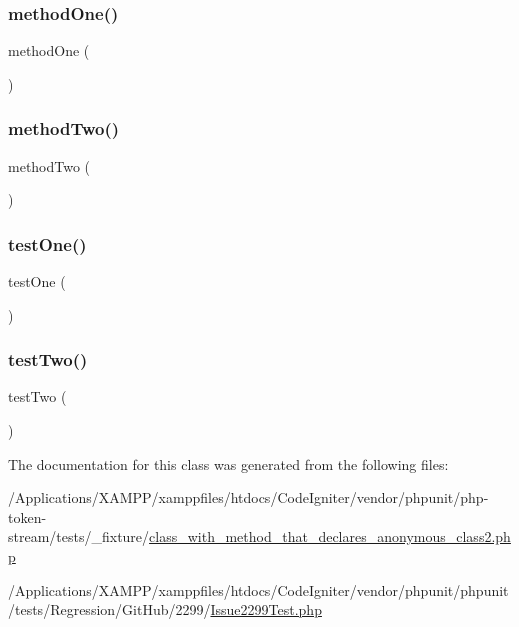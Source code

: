 \subsubsection{\texorpdfstring{method\+One()}{methodOne()}}
{\footnotesize\ttfamily method\+One (\begin{DoxyParamCaption}{ }\end{DoxyParamCaption})}

\mbox{\label{class_test_adc4891c4d8a68fb4b8c93e6b6bfe88a5}} 
\subsubsection{\texorpdfstring{method\+Two()}{methodTwo()}}
{\footnotesize\ttfamily method\+Two (\begin{DoxyParamCaption}{ }\end{DoxyParamCaption})}

\mbox{\label{class_test_afbf3ff88b322c6a7197ce02297cd23a0}} 
\subsubsection{\texorpdfstring{test\+One()}{testOne()}}
{\footnotesize\ttfamily test\+One (\begin{DoxyParamCaption}{ }\end{DoxyParamCaption})}

\mbox{\label{class_test_a4fb9974ce113d5d1db8075e0db0dc9b6}} 
\subsubsection{\texorpdfstring{test\+Two()}{testTwo()}}
{\footnotesize\ttfamily test\+Two (\begin{DoxyParamCaption}{ }\end{DoxyParamCaption})}



The documentation for this class was generated from the following files\+:\begin{DoxyCompactItemize}
\item 
/\+Applications/\+X\+A\+M\+P\+P/xamppfiles/htdocs/\+Code\+Igniter/vendor/phpunit/php-\/token-\/stream/tests/\+\_\+fixture/\mbox{\hyperlink{class__with__method__that__declares__anonymous__class2_8php}{class\+\_\+with\+\_\+method\+\_\+that\+\_\+declares\+\_\+anonymous\+\_\+class2.\+php}}\item 
/\+Applications/\+X\+A\+M\+P\+P/xamppfiles/htdocs/\+Code\+Igniter/vendor/phpunit/phpunit/tests/\+Regression/\+Git\+Hub/2299/\mbox{\hyperlink{_issue2299_test_8php}{Issue2299\+Test.\+php}}\end{DoxyCompactItemize}
